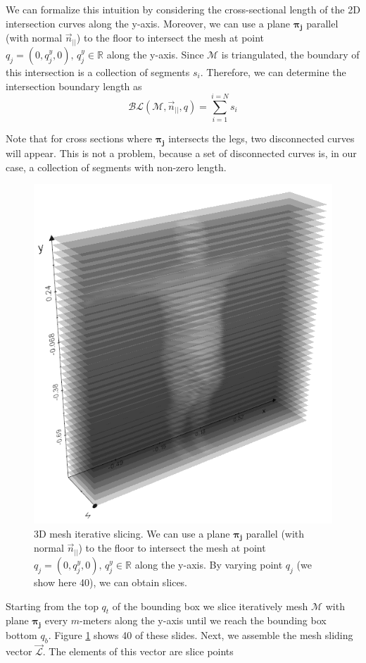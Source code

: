 \documentclass[runningheads, orivec]{llncs}
\begin{document}
We 
can formalize this intuition by considering the cross-sectional length of the 
2D intersection curves\cite{book.compu.topo} along the y-axis. Moreover, we 
can 
use a plane $\boldsymbol{\pi_j}$ parallel (with normal $\vec{n}_{||}$) to the 
floor to intersect the mesh at point $q_j = (0, q^y_j, 0), \,  q^y_j \in 
\mathbb{R}$ along the y-axis. Since $\mathcal{M}$ is triangulated, the boundary 
of this 
intersection is a collection of segments $s_i$. Therefore, we can 
determine the intersection boundary length as
\begin{equation}\label{eq:boundary_length}
\mathcal{BL}(\mathcal{M}, \vec{n}_{||}, q) = \sum_{i = 
	1}^{i = N}s_i
\end{equation}

Note that for cross sections where $\boldsymbol{\pi_j}$ intersects the legs, 
two 
disconnected curves will appear. This is not a problem, because a 
set of disconnected curves is, in our case, a collection of segments with 
non-zero length.

\begin{figure}[h!]
	\begin{center}
		\includegraphics[width=0.5\linewidth]{subject_2_with_cutting_planes_xrays.png}
	\end{center}
	\caption{3D mesh iterative slicing. We 
		can use a plane $\boldsymbol{\pi_j}$ parallel (with normal 
		$\vec{n}_{||}$) to the 
		floor to intersect the mesh at point $q_j = (0, q^y_j, 0), \,  q^y_j 
		\in 
		\mathbb{R}$ along the y-axis. By varying point $q_j$ (we show here 40), 
		we can obtain 
		slices.}
	\label{fig:subjects_planes_xrays}
\end{figure}

Starting 
from the 
top $q_t$ of the bounding box we slice iteratively mesh $\mathcal{M}$ with 
plane 
$\boldsymbol{\pi_j}$ every $m$-meters along the y-axis until we reach the 
bounding box bottom 
$q_b$. Figure \ref{fig:subjects_planes_xrays} shows 40 of these 
slides. Next, we assemble the mesh sliding vector $\vec{\mathcal{L}}$. The 
elements of 
this vector are slice points
\end{document}
